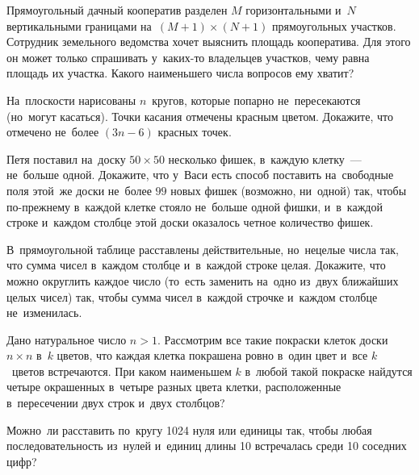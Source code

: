 \begin{problems}
\item
Прямоугольный дачный кооператив разделен $M$ горизонтальными
и~$N$ вертикальными границами на~$(M + 1) \times (N + 1)$ прямоугольных
участков.
Сотрудник земельного ведомства хочет выяснить площадь кооператива.
Для этого он может только спрашивать у~каких-то владельцев участков, чему
равна площадь их участка.
Какого наименьшего числа вопросов ему хватит?

\item
На~плоскости нарисованы $n$~кругов, которые попарно не~пересекаются
(но~могут касаться).
Точки касания отмечены красным цветом.
Докажите, что отмечено не~более $(3 n - 6)$ красных точек.

\item
Петя поставил на~доску $50 \times 50$ несколько фишек, в~каждую клетку~---
не~больше одной.
Докажите, что у~Васи есть способ поставить на~свободные поля этой~же доски
не~более $99$ новых фишек (возможно, ни~одной) так, чтобы по-прежнему в~каждой
клетке стояло не~больше одной фишки, и~в~каждой строке и~каждом столбце этой
доски оказалось четное количество фишек.

\item
В~прямоугольной таблице расставлены действительные, но~нецелые числа так, что
сумма чисел в~каждом столбце и~в~каждой строке целая.
Докажите, что можно округлить каждое число (то~есть заменить на~одно из~двух
ближайших целых чисел) так, чтобы сумма чисел в~каждой строчке и~каждом столбце
не~изменилась.

\item
Дано натуральное число $n > 1$.
Рассмотрим все такие покраски клеток доски $n \times n$ в~$k$ цветов, что
каждая клетка покрашена ровно в~один цвет и~все $k$~цветов встречаются.
При каком наименьшем $k$ в~любой такой покраске найдутся четыре окрашенных
в~четыре разных цвета клетки, расположенные в~пересечении двух строк и~двух
столбцов?

\item
Можно~ли расставить по~кругу 1024 нуля или единицы так, чтобы любая
последовательность из~нулей и~единиц длины 10 встречалась среди 10 соседних
цифр?

\end{problems}

